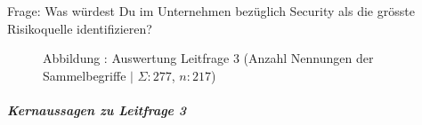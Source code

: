 \documentclass[../../main.tex]{subfiles}
\begin{document}
\begin{sloppypar}
Frage: Was würdest Du im Unternehmen bezüglich Security als die grösste Risikoquelle identifizieren?
\end{sloppypar}

\addtocounter{figure}{1}\begin{figure}[H]
    
    \vspace*{-5mm}
    \caption*{Abbildung \thefigure: Auswertung Leitfrage 3 (Anzahl Nennungen der Sammelbegriffe $\vert$ $\Sigma: 277$, $n: 217$)}
    \label{pgfplot_leitfrage3}
\end{figure}

\subparagraph*{Kernaussagen zu Leitfrage 3}\mbox{}

\end{document}
